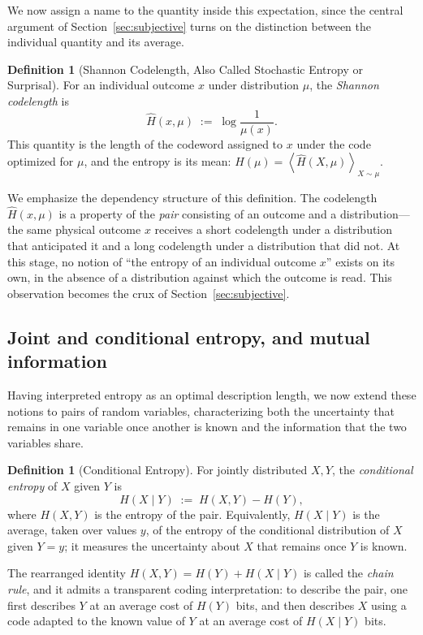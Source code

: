 \documentclass[10pt]{article}
\theoremstyle{definition}
\newtheorem{definition}[theorem]{Definition}
\theoremstyle{remark}
\newcommand{\E}[1]{\left\langle #1 \right\rangle}
\begin{document}
We now assign a name to the quantity inside this expectation, since the central argument of Section~\ref{sec:subjective} turns on the distinction between the individual quantity and its average.

\begin{definition}[Shannon Codelength, Also Called Stochastic Entropy or Surprisal]
\label{def:codelength}
For an individual outcome $x$ under distribution $\mu$, the \emph{Shannon codelength} is
\[
\hat H(x, \mu) \;:=\; \log \frac{1}{\mu(x)} .
\]
This quantity is the length of the codeword assigned to $x$ under the code optimized for $\mu$, and the entropy is its mean: $H(\mu) = \E{\hat H(X,\mu)}_{X \sim \mu}$.
\end{definition}

We emphasize the dependency structure of this definition. The codelength $\hat H(x, \mu)$ is a property of the \emph{pair} consisting of an outcome and a distribution---the same physical outcome $x$ receives a short codelength under a distribution that anticipated it and a long codelength under a distribution that did not. At this stage, no notion of ``the entropy of an individual outcome $x$'' exists on its own, in the absence of a distribution against which the outcome is read. This observation becomes the crux of Section~\ref{sec:subjective}.

\subsection{Joint and conditional entropy, and mutual information}

Having interpreted entropy as an optimal description length, we now extend these notions to pairs of random variables, characterizing both the uncertainty that remains in one variable once another is known and the information that the two variables share.

\begin{definition}[Conditional Entropy]
For jointly distributed $X, Y$, the \emph{conditional entropy} of $X$ given $Y$ is
\[
H(X \mid Y) \;:=\; H(X, Y) - H(Y),
\]
where $H(X,Y)$ is the entropy of the pair. Equivalently, $H(X \mid Y)$ is the average, taken over values $y$, of the entropy of the conditional distribution of $X$ given $Y = y$; it measures the uncertainty about $X$ that remains once $Y$ is known.
\end{definition}

The rearranged identity $H(X,Y) = H(Y) + H(X \mid Y)$ is called the \emph{chain rule}, and it admits a transparent coding interpretation: to describe the pair, one first describes $Y$ at an average cost of $H(Y)$ bits, and then describes $X$ using a code adapted to the known value of $Y$ at an average cost of $H(X \mid Y)$ bits.
\end{document}
